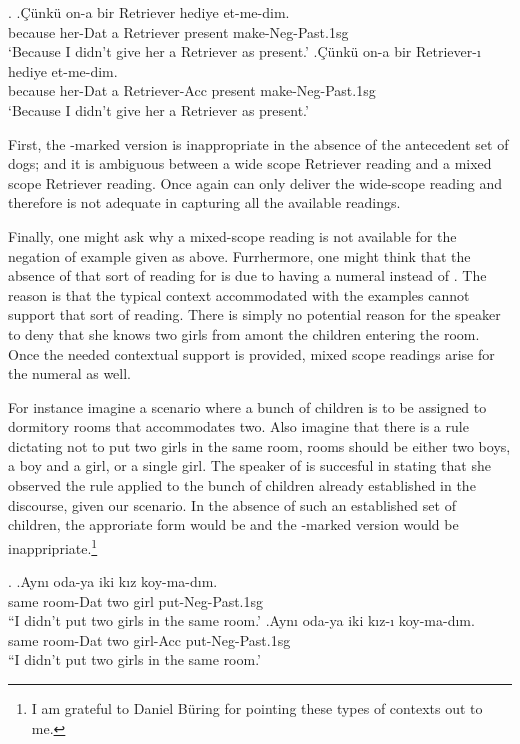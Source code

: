 \documentclass[11pt,a4paper]{article}
\begin{document}
\ex.
\ag.\label{retz}Çünkü on-a bir Retriever hediye et-me-dim.\\
 because her-Dat a Retriever present make-Neg-Past.1sg\\
`Because I didn't give her a Retriever as present.'
\bg.\label{reta}Çünkü on-a bir Retriever-ı hediye et-me-dim.\\ 
because her-Dat a Retriever-Acc present make-Neg-Past.1sg\\
`Because I didn't give her a Retriever as present.'


First, the \acc-marked version  is inappropriate in the absence of
the antecedent set of dogs; and it is ambiguous between a wide scope Retriever
reading and a mixed scope Retriever reading. Once again 
can only deliver the wide-scope reading and therefore is not adequate in
capturing all the available readings.  

Finally, one might ask why a mixed-scope reading is not available for the
negation of  example given as  above.
Furrhermore, one might think that the absence of that sort of reading for
 is due to having a numeral  instead of
. The reason is that the typical context accommodated with the
examples cannot support that sort of reading. There is simply no potential
reason for the speaker to deny that she knows two girls from amont the children
entering the room. Once the needed contextual support is provided, mixed scope
readings arise for the numeral  as well.

For instance imagine a scenario where a bunch of children is to be assigned to
dormitory rooms that accommodates two. Also imagine that there is a rule
dictating not to put two girls in the same room, rooms should be either two
boys, a boy and a girl, or a single girl. The speaker of  is
succesful in stating that she observed the rule applied to the bunch of
children already established in the discourse, given our scenario. In the
absence of such an established set of children, the approriate form would be
 and the \acc-marked version  would be
inappripriate.\footnote{I am grateful to Daniel Büring for pointing these types
of contexts out to me.} 

\ex.
\ag.\label{odaz}Aynı oda-ya iki kız koy-ma-dım.\\
same room-Dat  two girl put-Neg-Past.1sg\\
``I didn't put two girls in the same room.'
\bg.\label{odaa}Aynı oda-ya iki kız-ı koy-ma-dım.\\
same room-Dat  two girl-Acc put-Neg-Past.1sg\\
``I didn't put two girls in the same room.'
\end{document}

